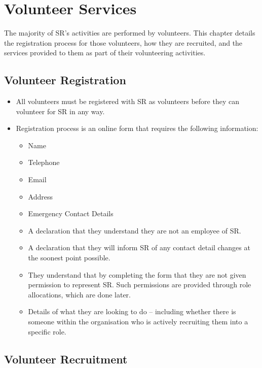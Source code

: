 \chapter{Volunteer Services}

The majority of SR's activities are performed by volunteers.  This chapter details the registration process for those volunteers, how they are recruited, and the services provided to them as part of their volunteering activities.

\section{Volunteer Registration}

\begin{itemize}
\item All volunteers must be registered with SR as volunteers before they can volunteer for SR in any way.
\item Registration process is an online form that requires the following information:
  \begin{itemize}
  \item Name
  \item Telephone
  \item Email
  \item Address
  \item Emergency Contact Details
  \item A declaration that they understand they are not an employee of SR.
  \item A declaration that they will inform SR of any contact detail changes at the soonest point possible.
  \item They understand that by completing the form that they are not given permission to represent SR.  Such permissions are provided through role allocations, which are done later.
  \item Details of what they are looking to do -- including whether there is someone within the organisation who is actively recruiting them into a specific role.
  \end{itemize}
\end{itemize}

\section{Volunteer Recruitment}

